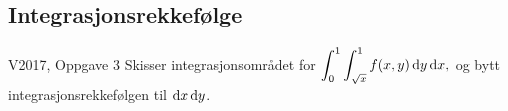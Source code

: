 \begin{frame}
  \subsection{Integrasjonsrekkefølge}\label{subsec:Integrasjonsrekkefolge}
  \begin{oppgave}{V2017, Oppgave 3}
    Skisser integrasjonsområdet for
    $\displaystyle
      \int_0^1 \int_{\sqrt{x}}^1 f(x,y) \mathop{}\! \mathrm{d} y\mathop{}\! \mathop{}\! \mathrm{d} x\mathop{}\!,
    $
    og bytt integrasjonsrekkefølgen til $\mathop{}\! \mathrm{d} x\mathop{}\! \mathop{}\! \mathrm{d} y\mathop{}\!$.
  \end{oppgave}
    \centerline{%
}
\end{frame}
